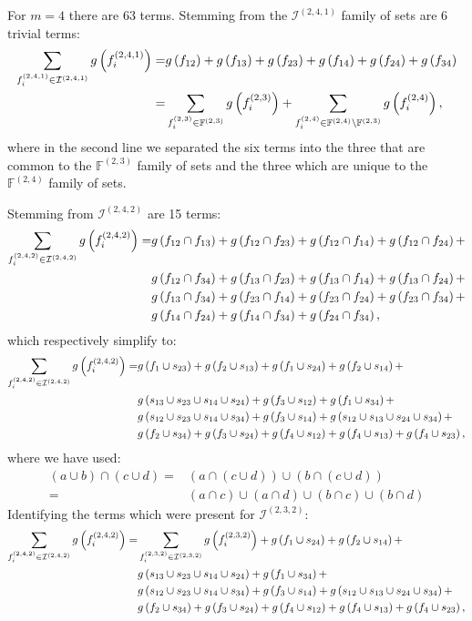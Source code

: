 \documentclass[11pt]{article}
\newcommand{\gxn}[1]{g\left(#1\right)}
\newcommand{\fn}[1]{f^{(#1)}}
\newcommand{\ints}[1]{\mathcal{I}^{(#1)}}
\newcommand{\setf}{\mathbb{F}}
\newcommand{\setfn}[1]{\setf^{(#1)}}
\begin{document}
For $m=4$ there are 63 terms. Stemming from the $\ints{2,4,1}$ family of sets 
are 6 trivial terms:
\begin{align}
	\sum_{\fn{2,4,1}_i\in\ints{2,4,1}}\gxn{\fn{2,4,1}_i} =& 
	  \gxn{\Di} + \gxn{\Dj} + \gxn{\Dk} + \gxn{\Dl} + 
	  \gxn{\Dm} + \gxn{\Dn}\nonumber\\
	=& \sum_{\fn{2,3}_i\in\setfn{2,3}}\gxn{\fn{2,3}_i} +
	   \sum_{\fn{2,4}_i\in\setfn{2,4}\setminus\setfn{2,3}}
	    \gxn{\fn{2,4}_i},
\end{align}
where in the second line we separated the six terms into the three that are
common to the $\setfn{2,3}$ family of sets and the three which are unique to
the $\setfn{2,4}$ family of sets.

Stemming from $\ints{2,4,2}$ are 15 terms:
\begin{align}
	\sum_{\fn{2,4,2}_i\in\ints{2,4,2}}\gxn{\fn{2,4,2}_i} =
	  & \gxn{\IDiDj} + \gxn{\IDiDk} + \gxn{\IDiDl} + \gxn{\IDiDm} +\nonumber\\ 
	  & \gxn{\IDiDn} + \gxn{\IDjDk} + \gxn{\IDjDl} + \gxn{\IDjDm} +\nonumber\\ 
	  & \gxn{\IDjDn} + \gxn{\IDkDl} + \gxn{\IDkDm} + \gxn{\IDkDn} +\nonumber\\ 
	  & \gxn{\IDlDm} + \gxn{\IDlDn} + \gxn{\IDmDn},
\end{align}
which respectively simplify to:
\begin{align}
	\sum_{\fn{2,4,2}_i\in\ints{2,4,2}}\gxn{\fn{2,4,2}_i} =
	& \gxn{f_1\cup\Ik} + \gxn{f_2\cup\Ij} + \gxn{f_1\cup\In} + 
	  \gxn{f_2\cup\Il} + \nonumber\\
	& \gxn{\Ij\cup\Ik\cup\Il\cup\In} + \gxn{f_3\cup\Ii} + 
	  \gxn{f_1\cup\Io} + \nonumber\\
	& \gxn{\Ii\cup\Ik\cup\Il\cup\Io} + \gxn{f_3\cup\Il} 
	+ \gxn{\Ii\cup\Ij\cup\In\cup\Io} + \nonumber\\
	& \gxn{f_2\cup\Io} + \gxn{f_3\cup\In} + \gxn{f_4\cup\Ii} + 
	  \gxn{f_4\cup\Ij} + \gxn{f_4\cup\Ik},
\end{align}
where we have used:
\begin{align}
	\left(a\cup b\right)\cap\left(c\cup d\right) =&
	  \left(a\cap\left(c\cup d\right)\right)\cup
	  \left(b\cap\left(c\cup d\right)\right)\nonumber\\
	   =& \left(a\cap c\right)\cup\left(a\cap d\right)\cup
          \left(b\cap c\right)\cup\left(b\cap d\right)
\end{align}
Identifying the terms which were present for $\ints{2,3,2}$:
\begin{align}
	\sum_{\fn{2,4,2}_i\in\ints{2,4,2}}\gxn{\fn{2,4,2}_i} =
	& \sum_{\fn{2,3,2}_i\in\ints{2,3,2}}\gxn{\fn{2,3,2}_i} + 
      \gxn{f_1\cup\In} + \gxn{f_2\cup\Il} + \nonumber\\
	& \gxn{\Ij\cup\Ik\cup\Il\cup\In}  +  \gxn{f_1\cup\Io} + \nonumber\\
	& \gxn{\Ii\cup\Ik\cup\Il\cup\Io} + \gxn{f_3\cup\Il} 
	+ \gxn{\Ii\cup\Ij\cup\In\cup\Io} + \nonumber\\
	& \gxn{f_2\cup\Io} + \gxn{f_3\cup\In} + \gxn{f_4\cup\Ii} + 
	\gxn{f_4\cup\Ij} + \gxn{f_4\cup\Ik},
\end{align}
\end{document}
